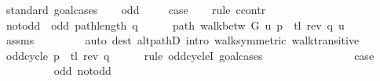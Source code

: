 \begin{isabellebody}
%
\isadelimproof
%
\endisadelimproof
%
\isatagproof
{}\isamarkupfalse%
\ {\isacharparenleft}{\kern0pt}standard{\isacharcomma}{\kern0pt}\ goal{\isacharunderscore}{\kern0pt}cases{\isacharparenright}{\kern0pt}\isanewline
\ \ \isamarkupfalse%
\ odd{\isacharcolon}{\kern0pt}\ {}\isanewline
\ \ \isamarkupfalse%
\ {\isacharquery}{\kern0pt}case\isanewline
\ \ \isamarkupfalse%
\ {\isacharparenleft}{\kern0pt}rule\ ccontr{\isacharparenright}{\kern0pt}\isanewline
\ \ \ \ \isamarkupfalse%
\ not{\isacharunderscore}{\kern0pt}odd{\isacharcolon}{\kern0pt}\ {\isachardoublequoteopen}{\isasymnot}\ odd\ {\isacharparenleft}{\kern0pt}path{\isacharunderscore}{\kern0pt}length\ q{\isacharparenright}{\kern0pt}{\isachardoublequoteclose}\isanewline
\ \ \ \ \isamarkupfalse%
\ path{\isacharcolon}{\kern0pt}\ {\isachardoublequoteopen}walk{\isacharunderscore}{\kern0pt}betw\ G\ u\ {\isacharparenleft}{\kern0pt}p\ {\isacharat}{\kern0pt}\ tl\ {\isacharparenleft}{\kern0pt}rev\ q{\isacharparenright}{\kern0pt}{\isacharparenright}{\kern0pt}\ u{\isachardoublequoteclose}\isanewline
\ \ \ \ \ \ \isamarkupfalse%
\ assms{\isacharparenleft}{\kern0pt}{}{\isacharcomma}{\kern0pt}\ {}{\isacharparenright}{\kern0pt}\isanewline
\ \ \ \ \ \ \isamarkupfalse%
\ {\isacharparenleft}{\kern0pt}auto\ dest{\isacharcolon}{\kern0pt}\ alt{\isacharunderscore}{\kern0pt}pathD{\isacharparenleft}{\kern0pt}{}{\isacharparenright}{\kern0pt}\ intro{\isacharcolon}{\kern0pt}\ walk{\isacharunderscore}{\kern0pt}symmetric\ walk{\isacharunderscore}{\kern0pt}transitive{\isacharparenright}{\kern0pt}\isanewline
\ \ \ \ \isamarkupfalse%
\ \isamarkupfalse%
\ {\isachardoublequoteopen}odd{\isacharunderscore}{\kern0pt}cycle\ {\isacharparenleft}{\kern0pt}p\ {\isacharat}{\kern0pt}\ tl\ {\isacharparenleft}{\kern0pt}rev\ q{\isacharparenright}{\kern0pt}{\isacharparenright}{\kern0pt}{\isachardoublequoteclose}\isanewline
\ \ \ \ \isamarkupfalse%
\ {\isacharparenleft}{\kern0pt}rule\ odd{\isacharunderscore}{\kern0pt}cycleI{\isacharcomma}{\kern0pt}\ goal{\isacharunderscore}{\kern0pt}cases{\isacharparenright}{\kern0pt}\isanewline
\ \ \ \ \ \ \isamarkupfalse%
\ {}\isanewline
\ \ \ \ \ \ \isamarkupfalse%
\ {\isacharquery}{\kern0pt}case\isanewline
\ \ \ \ \ \ \ \ \isamarkupfalse%
\ odd\ not{\isacharunderscore}{\kern0pt}odd\isanewline
\ \ \ \ \ \ \ \ \isamarkupfalse%

\end{isabellebody}
